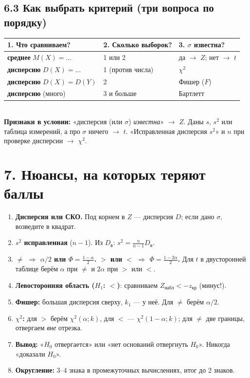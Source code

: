 \documentclass[a4paper,11pt]{extarticle}
\newcommand{\kr}{\text{кр}}\newcommand{\nab}{\text{набл}}
\begin{document}
\subsection*{6.3 Как выбрать критерий (три вопроса по порядку)}
\begin{tabular}{|p{6.4cm}|p{4.2cm}|p{5cm}|}\hline
\textbf{1. Что сравниваем?} & \textbf{2. Сколько выборок?} & \textbf{3. $\sigma$ известна?}\\\hline
\textbf{среднее} $M(X)=\dots$ & 1 или 2 & да $\to$ $Z$; нет $\to$ $t$\\\hline
\textbf{дисперсию} $D(X)=\dots$ & 1 (против числа) & $\chi^2$\\\hline
\textbf{дисперсию} $D(X)=D(Y)$ & 2 & Фишер ($F$)\\\hline
\textbf{дисперсию} (много) & 3 и больше & Бартлетт\\\hline
\end{tabular}
\\[3pt]
\textbf{Признаки в условии:} «дисперсия (или $\sigma$) \emph{известна}» $\to$ $Z$. Даны $s$, $s^2$ или таблица измерений, а про $\sigma$ ничего $\to$ $t$. «Исправленная дисперсия $s^2$» и $n$ при проверке дисперсии $\to$ $\chi^2$.

\section*{7. Нюансы, на которых теряют баллы}
\begin{enumerate}
\item \textbf{Дисперсия или СКО.} Под корнем в $Z$ --- дисперсия $D$; если дано $\sigma$, возведите в квадрат.
\item \textbf{$s^2$ исправленная} ($n-1$). Из $D_{\text{в}}$: $s^2=\frac{n}{n-1}D_{\text{в}}$.
\item \textbf{$\ne$ $\Rightarrow$ $\alpha/2$ или $\Phi=\frac{1-\alpha}{2}$.} \textbf{$>$ или $<$ $\Rightarrow$ $\Phi=\frac{1-2\alpha}{2}$.} Для $t$ в двусторонней таблице берём $\alpha$ при $\ne$ и $2\alpha$ при $>$ или $<$.
\item \textbf{Левосторонняя область ($H_1$: $<$)}: сравниваем $Z_\nab<-z_\kr$ (минус!).
\item \textbf{Фишер:} большая дисперсия сверху, $k_1$ --- у неё. Для $\ne$ берём $\alpha/2$.
\item \textbf{$\chi^2$:} для $>$ берём $\chi^2(\alpha;k)$, для $<$ --- $\chi^2(1-\alpha;k)$; для $\ne$ две границы, отвергаем \emph{вне} отрезка.
\item \textbf{Вывод:} «$H_0$ отвергается» или «нет оснований отвергнуть $H_0$». Никогда «доказали $H_0$».
\item \textbf{Округление:} 3--4 знака в промежуточных вычислениях, итог до 2 знаков.
\end{enumerate}
\end{document}
